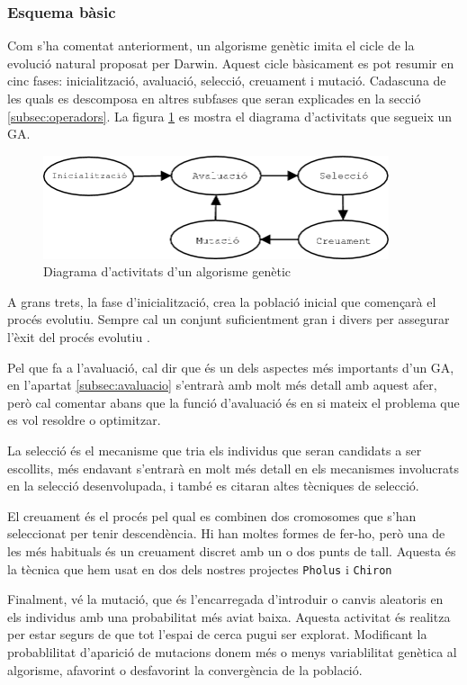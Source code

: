 \subsubsection{Esquema bàsic}

Com s'ha comentat anteriorment, un algorisme genètic imita el cicle de la
evolució natural proposat per Darwin. Aquest cicle bàsicament es pot resumir en
cinc fases: inicialització, avaluació, selecció, creuament i mutació. Cadascuna
de les quals es descomposa en altres subfases que seran explicades en la secció
\ref{subsec:operadors}. La figura \ref{fig:ga} es mostra el diagrama
d'activitats que segueix un GA.

\begin{figure} \centering \includegraphics[width=4in]{intro/ga}
\caption{\label{fig:ga}Diagrama d'activitats d'un algorisme genètic}
\end{figure}

A grans trets, la fase d'inicialització, crea la població inicial que començarà
el procés evolutiu. Sempre cal un conjunt suficientment gran i divers per
assegurar l'èxit del procés evolutiu \cite{G02}.

Pel que fa a l'avaluació, cal dir que és un dels aspectes més importants d'un
GA, en l'apartat \ref{subsec:avaluacio} s'entrarà amb molt més detall amb aquest
afer, però cal comentar abans que la funció d'avaluació és en si mateix el
problema que es vol resoldre o optimitzar.

La selecció és el mecanisme que tria els individus que seran candidats a ser
escollits, més endavant s'entrarà en molt més detall en els mecanismes
involucrats en la selecció desenvolupada, i també es citaran altes tècniques de
selecció.

El creuament és el procés pel qual es combinen dos cromosomes que s'han
seleccionat per tenir descendència. Hi han moltes formes de fer-ho, però una de
les més habituals és un creuament discret amb un o dos punts de tall.  Aquesta
és la tècnica que hem usat en dos dels nostres projectes \texttt{Pholus} i
\texttt{Chiron}  %

Finalment, vé la mutació, que és l'encarregada d'introduir o canvis aleatoris en
els individus amb una probabilitat més aviat baixa. Aquesta activitat és
realitza per estar segurs de que tot l'espai de cerca pugui ser explorat.
Modificant la probablilitat d'aparició de mutacions donem més o menys
variablilitat genètica al algorisme, afavorint o desfavorint la convergència de
la població.

